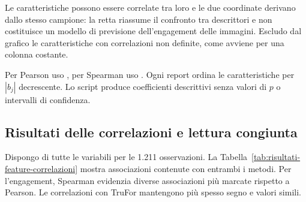Le caratteristiche possono essere correlate tra loro e le due coordinate derivano dallo stesso campione: la retta riassume il confronto tra descrittori e non costituisce un modello di previsione dell'engagement delle immagini. Escludo dal grafico le caratteristiche con correlazioni non definite, come avviene per una colonna costante.

Per Pearson uso , per Spearman uso . Ogni report ordina le caratteristiche per $|b_j|$ decrescente. Lo script produce coefficienti descrittivi senza valori di $p$ o intervalli di confidenza.

\subsection{Risultati delle correlazioni e lettura congiunta}
\label{subsec:associazione-visive-correlazioni}

Dispongo di tutte le variabili per le 1.211 osservazioni. La Tabella~\ref{tab:risultati-feature-correlazioni} mostra associazioni contenute con entrambi i metodi. Per l'engagement, Spearman evidenzia diverse associazioni più marcate rispetto a Pearson. Le correlazioni con TruFor mantengono più spesso segno e valori simili.

